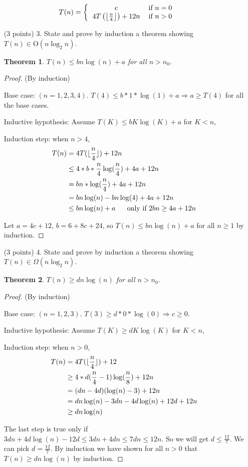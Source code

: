 \documentclass[paper=a4, fontsize=11pt]{scrartcl}
\DeclarePairedDelimiter\floor{\lfloor}{\rfloor}
\newtheorem{theorem}{Theorem}
\numberwithin{equation}{section}		%
\numberwithin{figure}{section}			%
\numberwithin{table}{section}				%
\begin{document}
\[
T(n) = \left\{
\begin{tabular}{cc}
c & \text{if} $n=0$ \\
$4T\left(\left\lfloor\frac{n}{4}\right\rfloor\right)+12n$ & \text{if} $n>0$ \\
\end{tabular}\right.
\]
\begin{enumerate}
\item [(3 points) 3.] State and prove by induction a theorem showing $T(n)\in\text{O}(n\log_2n)$.
\begin{theorem}
	$T(n) \leq bn\log(n) + a$ for all $n>n_0$.
\end{theorem}
\begin{proof}(By induction)
	
	Base case: $(n = 1,2,3,4)$. 
	$T(4) \leq b*1*\log(1) + a \Rightarrow a \geq T(4)$ for all the base cases.  
	
	Inductive hypothesis: Assume $T(K) \leq bK\log(K) + a$ for $K<n$,
	
	Induction step: when $n>4$,
	\begin{align*}
	T(n) &= 4T(\floor{\frac{n}{4}}) + 12n \\
	&\leq 4*b*\frac{n}{4}\log(\frac{n}{4}) + 4a + 12n \\
	&= bn*\log(\frac{n}{4}) + 4a + 12n \\
	&= bn\log(n) - bn\log(4) + 4a + 12n \\
	&\leq bn\log(n) + a \ \ \ \ \text{ only if } 2bn \geq 4a + 12n
	\end{align*}
	
	Let $a = 4c + 12$, $b=6 + 8c+ 24$, so $T(n) \leq bn\log(n) + a$ for all $n\geq 1$ by induction.
\end{proof}



\item [(3 points) 4.] State and prove by induction a theorem showing $T(n)\in\Omega(n\log_2n)$.
\begin{theorem}
	$T(n) \geq dn\log(n)$ for all $n>n_0$.
\end{theorem}
\begin{proof}(By induction)
	
	Base case: $(n = 1,2,3)$.
	$T(3) \geq d*0*\log(0) \Rightarrow c \geq 0$.  
	
	Inductive hypothesis: Assume $T(K) \geq dK\log(K )$ for $K<n$,
	
	Induction step: when $n>0$,
	\begin{align*}
	T(n) &= 4T(\floor{\frac{n}{4}}) + 12 \\
	&\geq 4*d(\frac{n}{4}-1)\log(\frac{n}{8}) + 12n \\
	&= (dn-4d)(\log(n)-3) + 12n \\
	&= dn\log(n) - 3dn - 4d\log(n) + 12d + 12n \\
	&\geq dn\log(n)
	\end{align*}
	
	The last step is true only if $3dn + 4d\log(n)-12d \leq 3dn + 4dn \leq 7dn \leq 12n$. So we will get $d \leq \frac{12}{7}$. We can pick $d = \frac{12}{7}$.
	By induction we have shown for all $n>0$ that $T(n) \geq dn\log(n)$  by induction.
\end{proof}
\end{enumerate}
\end{document}
